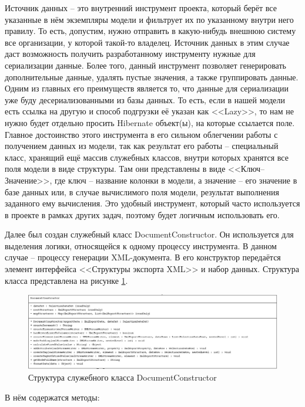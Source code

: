 \documentclass[a4paper,12pt]{diplom}
\begin{document}
Источник данных -- это внутренний инструмент проекта, который берёт все указанные в нём экземпляры модели и фильтрует их по указанному внутри него правилу. То есть, допустим, нужно отправить в какую-нибудь внешнюю систему все организации, у которой такой-то владелец. Источник данных в этим случае даст возможность получить разработанному инструменту нужные для сериализации данные. Более того, данный инструмент позволяет генерировать дополнительные данные, удалять пустые значения, а также группировать данные. Одним из главных его преимуществ является то, что данные для сериализации уже буду десериализованными из базы данных. То есть, если в нашей модели есть ссылка на другую и способ подгрузки её указан как <<Lazy>>, то нам не нужно будет отдельно просить Hibernate объект(ы), на которые ссылается поле. Главное достоинство этого инструмента в его сильном облегчении работы с получением данных из модели, так как результат его работы -- специальный класс, хранящий ещё массив служебных классов, внутри которых хранятся все поля модели в виде структуры. Там они представлены в виде <<Ключ--Значение>>, где ключ -- название колонки в модели, а значение -- его значение в базе данных или, в случае вычислимого поля модели, результат выполнения заданного ему вычисления. Это удобный инструмент, который часто используется в проекте в рамках других задач, поэтому будет логичным использовать его.

Далее был создан служебный класс DocumentConstructor. Он используется для выделения логики, относящейся к одному процессу инструмента. В данном случае -- процессу генерации XML-документа. В его конструктор передаётся элемент интерфейса <<Структуры экспорта XML>> и набор данных. Структура класса представлена на рисунке \ref{fig:docconstr}.

\begin{figure}[h!]
	\centering
	\includegraphics[width=\textwidth]{imgs/DocumentConstructor.jpg}
	\caption{Структура служебного класса DocumentConstructor}
	\label{fig:docconstr}
\end{figure}

В нём содержатся методы:
\end{document}
